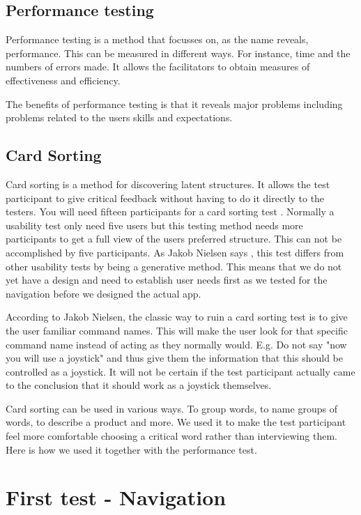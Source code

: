 \subsection{Performance testing}
Performance testing is a method that focusses on, as the name reveals, performance. This can be measured in different ways. For instance, time and the numbers of errors made.
It allows the facilitators to obtain measures of effectiveness and efficiency. \cite{performance}

The benefits of performance testing is that it reveals major problems including problems related to the users skills and expectations. \cite{performance}

\subsection{Card Sorting}
Card sorting is a method for discovering latent structures. \cite{cards}
It allows the test participant to give critical feedback without having to do it directly to the testers. 
You will need fifteen participants for a card sorting test \cite{cardSorting}. Normally a usability test only need five users but this testing method needs more participants to get a full view of the users preferred structure. This can not be accomplished by five participants. \cite{cardSorting}
As Jakob Nielsen says \cite{cardSorting}, this test differs from other usability tests by being a generative method. This means that we do not yet have a design and need to establish user needs first as we tested for the navigation before we designed the actual app. 

According to Jakob Nielsen, the classic way to ruin a card sorting test is to give the user familiar command names. This will make the user look for that specific command name instead of acting as they normally would.\cite{CardSorting}
E.g. Do not say "now you will use a joystick" and thus give them the information that this should be controlled as a joystick. It will not be certain if the test participant actually came to the conclusion that it should work as a joystick themselves. 

Card sorting can be used in various ways. To group words, to name groups of words, to describe a product and more. 
We used it to make the test participant feel more comfortable choosing a critical word rather than interviewing them. 
Here is how we used it together with the performance test.

\section{First test - Navigation}


